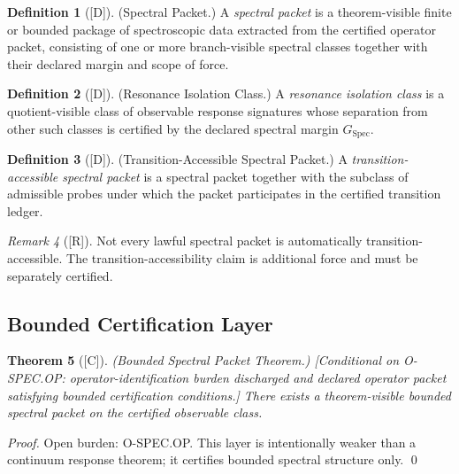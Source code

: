 \documentclass[12pt,oneside]{amsbook}
\theoremstyle{plain}
\newtheorem{theorem}{Theorem}[section]
\theoremstyle{definition}
\newtheorem{definition}[theorem]{Definition}
\theoremstyle{remark}
\newtheorem{remark}[theorem]{Remark}
\newcommand{\status}[1]{\textup{[#1]}}
\begin{document}
\begin{definition}[\status{D}]\label{def:spectral-packet}
\textup{(Spectral Packet.)}
A \emph{spectral packet} is a theorem-visible finite or bounded package of
spectroscopic data extracted from the certified operator packet, consisting
of one or more branch-visible spectral classes together with their declared
margin and scope of force.
\end{definition}

\begin{definition}[\status{D}]\label{def:resonance-isolation-class}
\textup{(Resonance Isolation Class.)}
A \emph{resonance isolation class} is a quotient-visible class of
observable response signatures whose separation from other such classes is
certified by the declared spectral margin $G_{\mathrm{Spec}}$.
\end{definition}

\begin{definition}[\status{D}]\label{def:transition-accessible-packet}
\textup{(Transition-Accessible Spectral Packet.)}
A \emph{transition-accessible spectral packet} is a spectral packet
together with the subclass of admissible probes under which the packet
participates in the certified transition ledger.
\end{definition}

\begin{remark}[\status{R}]\label{rem:accessibility-note}
Not every lawful spectral packet is automatically transition-accessible.
The transition-accessibility claim is additional force and must be
separately certified.
\end{remark}

\subsection{Bounded Certification Layer}\label{sec:spec-bounded}

\begin{theorem}[\status{C}]\label{thm:bounded-spectral-packet}
\textup{(Bounded Spectral Packet Theorem.)}
\textup{[Conditional on O-SPEC.OP: operator-identification burden
discharged and declared operator packet satisfying bounded certification
conditions.]}
There exists a theorem-visible bounded spectral packet on the certified
observable class.
\end{theorem}

\begin{proof}
Open burden: \textup{O-SPEC.OP}. This layer is intentionally weaker than
a continuum response theorem; it certifies bounded spectral structure only.
\qed
\end{proof}
\end{document}
